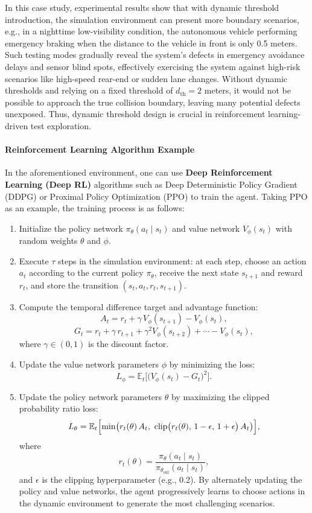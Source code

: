 \documentclass[manuscript,screen,review]{acmart}
\begin{document}
In this case study, experimental results show that with dynamic threshold introduction, the simulation environment can present more boundary scenarios, e.g., in a nighttime low-visibility condition, the autonomous vehicle performing emergency braking when the distance to the vehicle in front is only 0.5 meters. Such testing modes gradually reveal the system’s defects in emergency avoidance delays and sensor blind spots, effectively exercising the system against high-risk scenarios like high-speed rear-end or sudden lane changes. Without dynamic thresholds and relying on a fixed threshold of $d_{\mathrm{th}} = 2$ meters, it would not be possible to approach the true collision boundary, leaving many potential defects unexposed. Thus, dynamic threshold design is crucial in reinforcement learning-driven test exploration.

\paragraph{Reinforcement Learning Algorithm Example}  
In the aforementioned environment, one can use \textbf{Deep Reinforcement Learning (Deep RL)} algorithms such as Deep Deterministic Policy Gradient (DDPG) or Proximal Policy Optimization (PPO) to train the agent. Taking PPO as an example, the training process is as follows:
\begin{enumerate}
  \item Initialize the policy network $\pi_{\theta}(a_t \mid s_t)$ and value network $V_{\phi}(s_t)$ with random weights $\theta$ and $\phi$.
  \item Execute $\tau$ steps in the simulation environment: at each step, choose an action $a_t$ according to the current policy $\pi_{\theta}$, receive the next state $s_{t+1}$ and reward $r_t$, and store the transition $(s_t, a_t, r_t, s_{t+1})$.
  \item Compute the temporal difference target and advantage function:
  \[
    A_t = r_t + \gamma\,V_{\phi}(s_{t+1}) - V_{\phi}(s_t),
  \]
  \[
    G_t = r_t + \gamma\,r_{t+1} + \gamma^2 V_{\phi}(s_{t+2}) + \cdots - V_{\phi}(s_t),
  \]
  where $\gamma \in (0,1)$ is the discount factor.
  \item Update the value network parameters $\phi$ by minimizing the loss:
  \[
    L_{\phi} = \mathbb{E}_t\bigl[\bigl(V_{\phi}(s_t) - G_t \bigr)^2 \bigr].
  \]
  \item Update the policy network parameters $\theta$ by maximizing the clipped probability ratio loss:
  \[
    L_{\theta} = \mathbb{E}_t \Bigl[ \min \bigl( r_t(\theta)\,A_t,\ \mathrm{clip}\bigl(r_t(\theta),\,1-\epsilon,\,1+\epsilon\bigr)\,A_t \bigr) \Bigr],
  \]
  where
  \[
    r_t(\theta) = \frac{\pi_{\theta}(a_t \mid s_t)}{\pi_{\theta_{\mathrm{old}}}(a_t \mid s_t)},
  \]
  and $\epsilon$ is the clipping hyperparameter (e.g., 0.2). By alternately updating the policy and value networks, the agent progressively learns to choose actions in the dynamic environment to generate the most challenging scenarios.
\end{enumerate}
\end{document}

